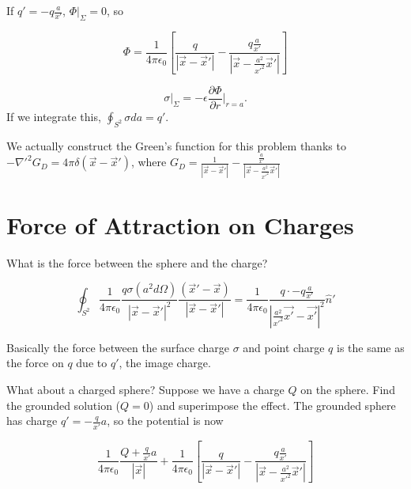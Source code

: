 \documentclass[a4paper,twoside,master.tex]{subfiles}
\begin{document}
If $q' = -q\frac{a}{x'}$, $\Phi\bigg|_\Sigma = 0$, so

\begin{equation}
    \Phi = \frac{1}{4\pi\epsilon_0}\left[\frac{q}{|\vec{x}-\vec{x}'|} -\frac{q\frac{a}{x'}}{\left|\vec{x}-\frac{a^2}{x'^2}\vec{x}'\right|}\right]
\end{equation}

\begin{equation}
    \sigma\bigg|_\Sigma = -\epsilon\frac{\partial\Phi}{\partial r}\bigg|_{r=a}.
\end{equation}
If we integrate this, $\oint_{S^2}\sigma da = q'$.

\begin{remark}
We actually construct the Green's function for this problem thanks to $-\nabla'^2 G_D = 4\pi\delta(\vec{x}-\vec{x}')$, where $G_D = \frac{1}{|\vec{x}-\vec{x}'|} - \frac{\frac{a}{x'}}{\left|\vec{x}-\frac{a^2}{x'^2}\vec{x}'\right|}$
\end{remark}

\section*{Force of Attraction on Charges}%
\label{sec:force_of_attraction_on_charges}

What is the force between the sphere and the charge?

\begin{equation}
   \oint_{S^2}\frac{1}{4\pi\epsilon_0}\frac{q\sigma (a^2 d\Omega)}{|\vec{x}-\vec{x}'|^2}\frac{(\vec{x}'-\vec{x})}{|\vec{x}-\vec{x}'|} = \frac{1}{4\pi\epsilon_0}\frac{q\cdot -q\frac{a}{x'}}{|\frac{a^2}{x'^2}\vec{x'} -\vec{x'}|^2}\hat{n}'
\end{equation}

Basically the force between the surface charge $\sigma$ and point
charge $q$ is the same as the force on $q$ due to $q'$, the image
charge.

What about a charged sphere? Suppose we have a charge $Q$ on the
sphere. Find the grounded solution ($Q = 0$) and superimpose the
effect. The grounded sphere has charge $q' = -\frac{q}{x'}a$, so the
potential is now

\begin{equation}
   \frac{1}{4\pi\epsilon_0}\frac{Q+\frac{q}{x'}a}{|\vec{x}|}+\frac{1}{4\pi\epsilon_0}\left[\frac{q}{|\vec{x}-\vec{x}'|} -\frac{q\frac{a}{x'}}{\left|\vec{x}-\frac{a^2}{x'^2}\vec{x}'\right|}\right]
\end{equation}
\end{document}
